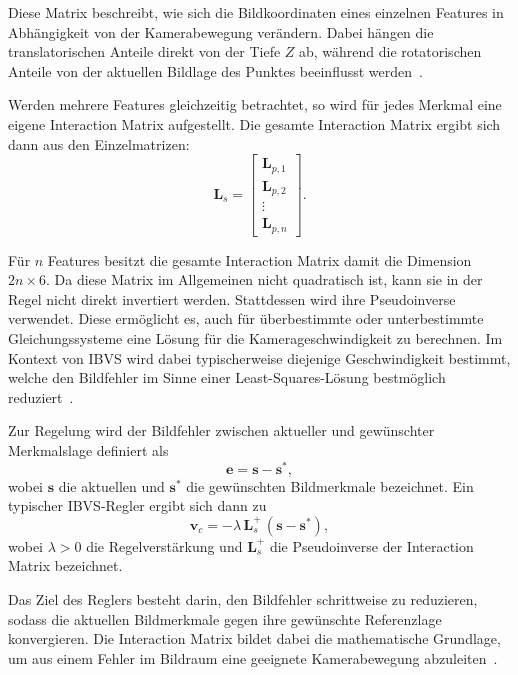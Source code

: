 Diese Matrix beschreibt, wie sich die Bildkoordinaten eines einzelnen Features in Abhängigkeit von der Kamerabewegung verändern. Dabei hängen die translatorischen Anteile direkt von der Tiefe $Z$ ab, während die rotatorischen Anteile von der aktuellen Bildlage des Punktes beeinflusst werden~\cite{chaumette2006visual}.

Werden mehrere Features gleichzeitig betrachtet, so wird für jedes Merkmal eine eigene Interaction Matrix aufgestellt. Die gesamte Interaction Matrix ergibt sich dann aus den Einzelmatrizen:
\begin{equation}
\mathbf{L}_s =
\begin{bmatrix}
\mathbf{L}_{p,1} \\
\mathbf{L}_{p,2} \\
\vdots \\
\mathbf{L}_{p,n}
\end{bmatrix}.
\end{equation}

Für $n$ Features besitzt die gesamte Interaction Matrix damit die Dimension $2n \times 6$. Da diese Matrix im Allgemeinen nicht quadratisch ist, kann sie in der Regel nicht direkt invertiert werden. Stattdessen wird ihre Pseudoinverse verwendet. Diese ermöglicht es, auch für überbestimmte oder unterbestimmte Gleichungssysteme eine Lösung für die Kamerageschwindigkeit zu berechnen. Im Kontext von \ac{IBVS} wird dabei typischerweise diejenige Geschwindigkeit bestimmt, welche den Bildfehler im Sinne einer Least-Squares-Lösung bestmöglich reduziert~\cite{chaumette2006visual, corke2017robotics}.

Zur Regelung wird der Bildfehler zwischen aktueller und gewünschter Merkmalslage definiert als
\begin{equation}
\mathbf{e} = \mathbf{s} - \mathbf{s}^{*},
\end{equation}
wobei $\mathbf{s}$ die aktuellen und $\mathbf{s}^{*}$ die gewünschten Bildmerkmale bezeichnet. Ein typischer \ac{IBVS}-Regler ergibt sich dann zu~\cite{chaumette2006visual}
\begin{equation}
\mathbf{v}_c = -\lambda \, \mathbf{L}_s^{+} \, (\mathbf{s} - \mathbf{s}^{*}),
\end{equation}
wobei $\lambda > 0$ die Regelverstärkung und $\mathbf{L}_s^{+}$ die Pseudoinverse der Interaction Matrix bezeichnet.

Das Ziel des Reglers besteht darin, den Bildfehler schrittweise zu reduzieren, sodass die aktuellen Bildmerkmale gegen ihre gewünschte Referenzlage konvergieren. Die Interaction Matrix bildet dabei die mathematische Grundlage, um aus einem Fehler im Bildraum eine geeignete Kamerabewegung abzuleiten~\cite{chaumette2006visual}.

